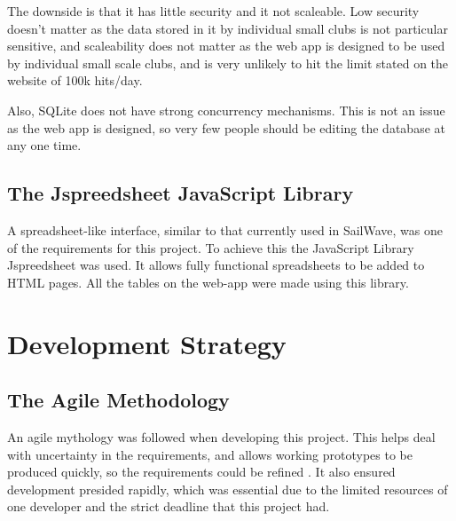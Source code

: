 \documentclass{l4proj}
\begin{document}
The downside is that it has little security and it not scaleable. Low security doesn't matter as the data stored in it by individual small clubs is not particular sensitive, and scaleability does not matter as the web app is designed to be used by individual small scale clubs, and is very unlikely to hit the limit stated on the website of 100k hits/day.

Also, SQLite does not have strong concurrency mechanisms. This is not an issue as the web app is designed, so very few people should be editing the database at any one time.

\subsection{The Jspreedsheet JavaScript Library}

A spreadsheet-like interface, similar to that currently used in SailWave, was one of the requirements for this project. To achieve this the JavaScript Library Jspreedsheet \citep{Jspreadsheet} was used. It allows fully functional spreadsheets to be added to HTML pages. All the tables on the web-app were made using this library.    

\section{Development Strategy}  

\subsection{The Agile Methodology}

An agile mythology was followed when developing this project. This helps deal with uncertainty in the requirements, and allows working prototypes to be produced quickly, so the requirements could be refined \citep{agile}. It also ensured development presided rapidly, which was essential due to the limited resources of one developer and the strict deadline that this project had.
\end{document}
